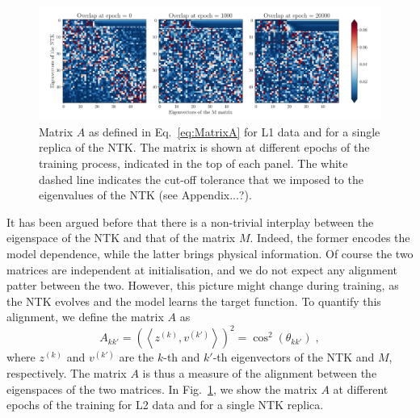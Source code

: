 

\begin{figure}[ht!]
  \centering
  \includegraphics[width=1\textwidth]{plots/ntk_pheno/ntk_alignment.pdf}
  \caption{Matrix $A$ as defined in Eq.~\eqref{eq:MatrixA} for L1 data and for a
  single replica of the NTK. The matrix is shown at different epochs of the
  training process, indicated in the top of each panel. The white dashed line
  indicates the cut-off tolerance that we imposed to the eigenvalues of the NTK
  (see Appendix...?).}
  \label{fig:NtkMAlign}
\end{figure}
It has been argued before that there is a non-trivial interplay between the
eigenspace of the NTK and that of the matrix $M$. Indeed, the former encodes the
model dependence, while the latter brings physical information. Of course the
two matrices are independent at initialisation, and we do not expect any
alignment patter between the two. However, this picture might change during
training, as the NTK evolves and the model learns the target function. To
quantify this alignment, we define the matrix $A$ as
\begin{equation}
  A_{kk'} = \left( \left< z^{(k)}, v^{(k')}\right> \right)^2 = \cos^2(\theta_{kk'}) \;,
  \label{eq:MatrixA}
\end{equation}
where $z^{(k)}$ and $v^{(k')}$ are the $k$-th and $k'$-th eigenvectors of the
NTK and $M$, respectively. The matrix $A$ is thus a measure of the alignment
between the eigenspaces of the two matrices. In Fig.~\ref{fig:NtkMAlign}, we
show the matrix $A$ at different epochs of the training for L2 data and for a
single NTK replica.


\FloatBarrier
